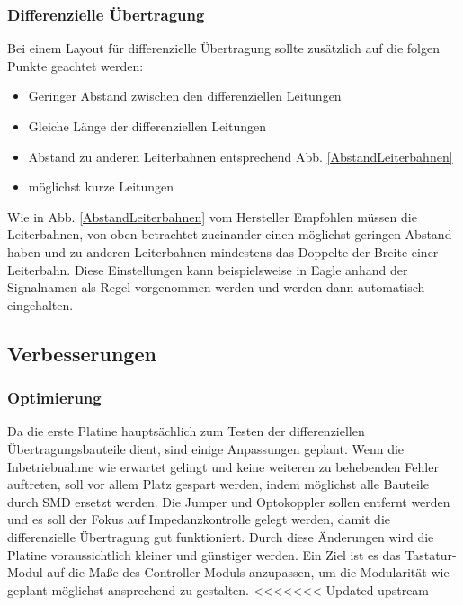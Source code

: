 \subsubsection{Differenzielle Übertragung}
Bei einem Layout für differenzielle Übertragung sollte zusätzlich auf die folgen Punkte geachtet werden:


\begin{itemize}
	\item Geringer Abstand zwischen den differenziellen Leitungen
	\item Gleiche Länge der differenziellen Leitungen
	\item Abstand zu anderen Leiterbahnen entsprechend Abb. \ref{AbstandLeiterbahnen}
	\item möglichst kurze Leitungen 
\end{itemize}


Wie in Abb. \ref{AbstandLeiterbahnen} vom Hersteller Empfohlen müssen die Leiterbahnen, von oben betrachtet zueinander einen möglichst geringen Abstand haben und zu anderen Leiterbahnen mindestens das Doppelte der Breite einer Leiterbahn. Diese Einstellungen kann beispielsweise in Eagle anhand der Signalnamen als Regel vorgenommen werden und werden dann automatisch eingehalten.

\subsection{Verbesserungen}
\subsubsection{Optimierung}

Da die erste Platine hauptsächlich zum Testen der differenziellen Übertragungsbauteile dient, sind einige Anpassungen geplant. \newline
Wenn die Inbetriebnahme wie erwartet gelingt und keine weiteren zu behebenden Fehler auftreten, soll vor allem Platz gespart werden, indem möglichst alle Bauteile durch SMD ersetzt werden. Die Jumper und Optokoppler sollen entfernt werden und es soll der Fokus auf Impedanzkontrolle gelegt werden, damit die differenzielle Übertragung gut funktioniert. \newline
Durch diese Änderungen wird die Platine voraussichtlich kleiner und günstiger werden. Ein Ziel ist es das Tastatur-Modul auf die Maße des Controller-Moduls anzupassen, um die Modularität wie geplant möglichst ansprechend zu gestalten. \newline
<<<<<<< Updated upstream

